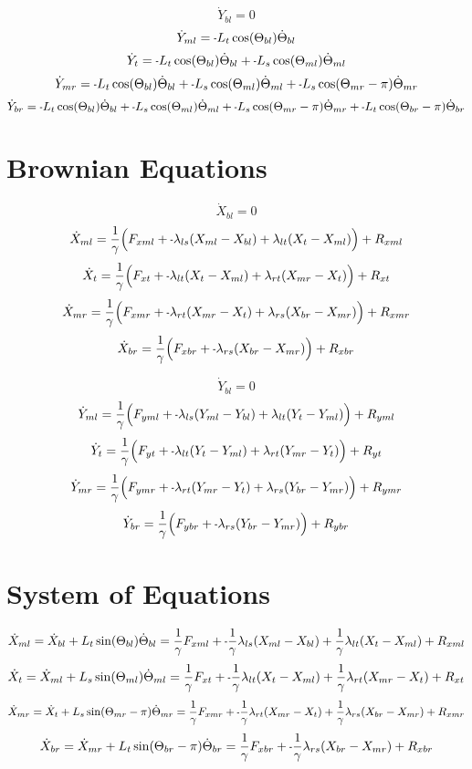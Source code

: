 \documentclass[11pt, landscape]{article}
\newcommand{\mn}{\scalebox{0.7}[1.0]{-}}
\begin{document}
$$\dot{Y}_{bl} = 0$$                                                               
$$\dot{Y}_{ml} = \mn L_{t}\cos(\Theta_{bl})  \dot{\Theta}_{bl}$$
$$\dot{Y}_{t}  = \mn L_{t}\cos(\Theta_{bl})  \dot{\Theta}_{bl} + \mn L_{s}\cos(\Theta_{ml})  \dot{\Theta}_{ml}$$
$$\dot{Y}_{mr} = \mn L_{t}\cos(\Theta_{bl})  \dot{\Theta}_{bl} + \mn L_{s}\cos(\Theta_{ml})  \dot{\Theta}_{ml} + \mn L_{s}\cos(\Theta_{mr}-\pi)  \dot{\Theta}_{mr}$$
$$\dot{Y}_{br} = \mn L_{t}\cos(\Theta_{bl})  \dot{\Theta}_{bl} + \mn L_{s}\cos(\Theta_{ml})  \dot{\Theta}_{ml} + \mn L_{s}\cos(\Theta_{mr}-\pi)  \dot{\Theta}_{mr} + \mn L_{t}\cos(\Theta_{br}-\pi)  \dot{\Theta}_{br}$$

\section{Brownian Equations}
$$\dot{X}_{bl} = 0$$
$$\dot{X}_{ml} = \frac{1}{\gamma} \Big(F_{xml} + \mn \lambda_{ls}(X_{ml} - X_{bl}) + \lambda_{lt}(X_{t } - X_{ml}) \Big) + R_{xml}$$
$$\dot{X}_{t } = \frac{1}{\gamma} \Big(F_{xt } + \mn \lambda_{lt}(X_{t } - X_{ml}) + \lambda_{rt}(X_{mr} - X_{t }) \Big) + R_{xt }$$
$$\dot{X}_{mr} = \frac{1}{\gamma} \Big(F_{xmr} + \mn \lambda_{rt}(X_{mr} - X_{t }) + \lambda_{rs}(X_{br} - X_{mr}) \Big) + R_{xmr}$$
$$\dot{X}_{br} = \frac{1}{\gamma} \Big(F_{xbr} + \mn \lambda_{rs}(X_{br} - X_{mr})                                 \Big) + R_{xbr}$$

$$\dot{Y}_{bl} = 0$$
$$\dot{Y}_{ml} = \frac{1}{\gamma} \Big(F_{yml} + \mn \lambda_{ls}(Y_{ml} - Y_{bl}) + \lambda_{lt}(Y_{t } - Y_{ml}) \Big) + R_{yml}$$
$$\dot{Y}_{t}  = \frac{1}{\gamma} \Big(F_{yt } + \mn \lambda_{lt}(Y_{t } - Y_{ml}) + \lambda_{rt}(Y_{mr} - Y_{t }) \Big) + R_{yt }$$
$$\dot{Y}_{mr} = \frac{1}{\gamma} \Big(F_{ymr} + \mn \lambda_{rt}(Y_{mr} - Y_{t }) + \lambda_{rs}(Y_{br} - Y_{mr}) \Big) + R_{ymr}$$
$$\dot{Y}_{br} = \frac{1}{\gamma} \Big(F_{ybr} + \mn \lambda_{rs}(Y_{br} - Y_{mr})                                 \Big) + R_{ybr}$$

\section{System of Equations}

$$\dot{X}_{ml} = \dot{X}_{bl} + L_{t}\sin(\Theta_{bl})      \dot{\Theta}_{bl} = \frac{1}{\gamma}F_{xml} + \mn\frac{1}{\gamma}\lambda_{ls}(X_{ml} - X_{bl}) + \frac{1}{\gamma}\lambda_{lt}(X_{t } - X_{ml}) + R_{xml}$$
$$\dot{X}_{t} = \dot{X}_{ml} + L_{s}\sin(\Theta_{ml})      \dot{\Theta}_{ml} = \frac{1}{\gamma}F_{xt } + \mn\frac{1}{\gamma}\lambda_{lt}(X_{t } - X_{ml}) + \frac{1}{\gamma}\lambda_{rt}(X_{mr} - X_{t }) + R_{xt }$$
$$\dot{X}_{mr} = \dot{X}_{t } + L_{s}\sin(\Theta_{mr}-\pi)  \dot{\Theta}_{mr} = \frac{1}{\gamma}F_{xmr} + \mn\frac{1}{\gamma}\lambda_{rt}(X_{mr} - X_{t }) + \frac{1}{\gamma}\lambda_{rs}(X_{br} - X_{mr}) + R_{xmr}$$
$$\dot{X}_{br} = \dot{X}_{mr} + L_{t}\sin(\Theta_{br}-\pi)  \dot{\Theta}_{br} = \frac{1}{\gamma}F_{xbr} + \mn\frac{1}{\gamma}\lambda_{rs}(X_{br} - X_{mr}) + R_{xbr}$$
\end{document}
